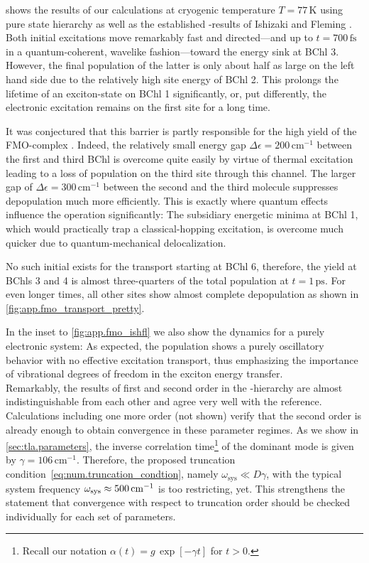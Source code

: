  shows the results of our calculations at cryogenic temperature $T=77\,\mathrm{K}$ using pure state hierarchy as well as the established \HEOM-results of Ishizaki and Fleming \cite{IsFl09_fmo}.
Both initial excitations move remarkably fast and directed---and up to $t=700\,\mathrm{fs}$ in a quantum-coherent, wavelike fashion---toward the energy sink at BChl 3.
However, the final population of the latter is only about half as large on the left hand side due to the relatively high site energy of BChl 2.
This prolongs the lifetime of an exciton-state on BChl 1 significantly, or, put differently, the electronic excitation remains on the first site for a long time.

It was conjectured that this barrier is partly responsible for the high yield of the FMO-complex \cite{IsFl09_fmo}.
Indeed, the relatively small energy gap $\Delta\epsilon = 200\, \mathrm{cm^{-1}}$ between the first and third BChl is overcome quite easily by virtue of thermal excitation leading to a loss of population on the third site through this channel.
The larger gap of $\Delta\epsilon = 300\,\mathrm{cm^{-1}}$ between the second and the third molecule suppresses depopulation much more efficiently.
This is exactly where quantum effects influence the operation significantly:
The subsidiary energetic minima at BChl 1, which would practically trap a classical-hopping excitation, is overcome much quicker due to quantum-mechanical delocalization.

No such initial  exists for the transport starting at BChl 6, therefore, the yield at BChls 3 and 4 is almost three-quarters of the total population at $t=1\,\mathrm{ps}$.
For even longer times, all other sites show almost complete depopulation as shown in \autoref{fig:app.fmo_transport_pretty}.

In the inset to \autoref{fig:app.fmo_ishfl} we also show the dynamics for a purely electronic system:
As expected, the population shows a purely oscillatory behavior with no effective excitation transport, thus emphasizing the importance of vibrational degrees of freedom in the exciton energy transfer.\\

Remarkably, the results of first and second order in the \NMSSE-hierarchy are almost indistinguishable from each other and agree very well with the reference.
Calculations including one more order (not shown) verify that the second order is already enough to obtain convergence in these parameter regimes.
As we show in \autoref{sec:tla.parameters}, the inverse correlation time\footnote{%
  Recall our notation $\alpha(t) = g \, \exp[-\gamma t]$ for $t > 0$.
}
of the dominant mode is given by $\gamma = 106\,\mathrm{cm^{-1}}$.
Therefore, the proposed truncation condition~\ref{eq:num.truncation_condtion}, namely $\omega_\mathrm{sys} \ll D \gamma$, with the typical system frequency $\omega_\mathrm{sys} \approx 500\,\mathrm{cm}^{-1}$ is too restricting, yet.
This strengthens the statement that convergence with respect to truncation order should be checked individually for each set of parameters.

